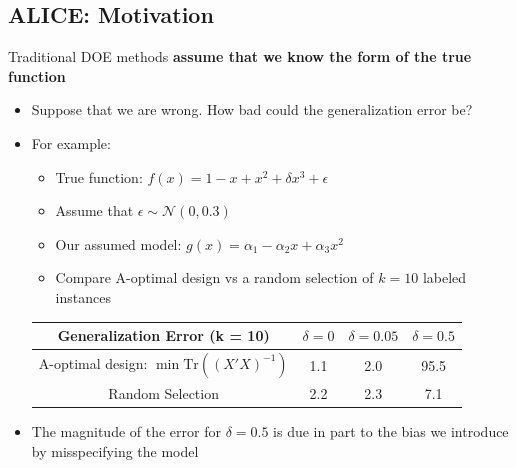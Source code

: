 \documentclass[10pt]{article}
\begin{document}
\subsection*{ALICE: Motivation}
Traditional DOE methods \textbf{assume that we know the form of the true function}
\begin{itemize}
	\item Suppose that we are wrong.  How bad could the generalization error be?
	\item For example:
    \begin{itemize}
	    \item True function: $f(x) = 1 - x + x^2 + \delta x^3 + \epsilon$
	    \item Assume that $\epsilon \sim \mathcal{N}(0, 0.3)$
	    \item Our assumed model: $g(x) = \alpha_1 - \alpha_2 x + \alpha_3 x^2$
	    \item Compare A-optimal design vs a random selection of $k = 10$ labeled instances
    \end{itemize}
    \begin{center}
        \begin{tabular}{|c|c|c|c|}
        \hline
        Generalization Error (k = 10) & $\delta = 0$ & $\delta = 0.05$ & $\delta = 0.5$ \\ \hline
        A-optimal design: $\min \text{Tr}\left((X'X)^{-1}\right)$ & 1.1 & 2.0 & 95.5 \\ \hline
        Random Selection & 2.2 & 2.3 & 7.1 \\ \hline
        \end{tabular}
    \end{center}
    \item The magnitude of the error for $\delta = 0.5$ is due in part to the bias we introduce by misspecifying the model
\end{itemize}
\end{document}
